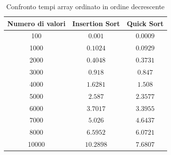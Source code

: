 \documentclass[
]{article}
\begin{document}
\begin{table}[!h]
    \begin{center}
        \begin{tabular}{|c|c|c|}
            \hline Numero di valori & Insertion Sort & Quick Sort \\
            \hline \hline 100       & $0.001$        & $0.0009$   \\
            \hline 1000             & $0.1024$       & $0.0929$   \\
            \hline 2000             & $0.4048$       & $0.3731$   \\
            \hline 3000             & $0.918$        & $0.847$    \\
            \hline 4000             & $1.6281$       & $1.508$    \\
            \hline 5000             & $2.587$        & $2.3577$   \\
            \hline 6000             & $3.7017$       & $3.3955$   \\
            \hline 7000             & $5.026$        & $4.6437$   \\
            \hline 8000             & $6.5952$       & $6.0721$   \\
            \hline 10000            & $10.2898$      & $7.6807$   \\
            \hline \hline
        \end{tabular}
    \end{center}
    \caption{Confronto tempi array ordinato in ordine decrescente}
\end{table}
\end{document}
